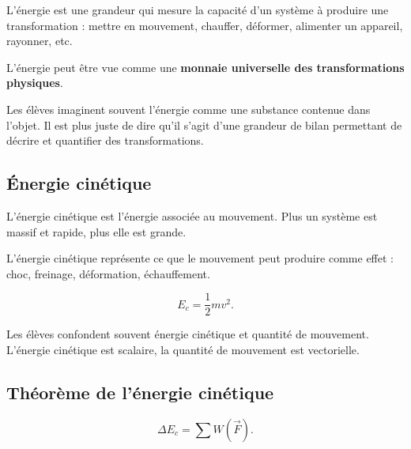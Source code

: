 \documentclass[11pt,a4paper]{article}
\begin{document}
\begin{sens}
L'énergie est une grandeur qui mesure la capacité d'un système à produire une transformation :
mettre en mouvement, chauffer, déformer, alimenter un appareil, rayonner, etc.
\end{sens}

\begin{imagem}
L'énergie peut être vue comme une \textbf{monnaie universelle des transformations physiques}.
\end{imagem}

\begin{fausseintuition}
Les élèves imaginent souvent l'énergie comme une substance contenue dans l'objet.
Il est plus juste de dire qu'il s'agit d'une grandeur de bilan permettant de décrire et quantifier des transformations.
\end{fausseintuition}

\subsection{Énergie cinétique}

\begin{sens}
L'énergie cinétique est l'énergie associée au mouvement.
Plus un système est massif et rapide, plus elle est grande.
\end{sens}

\begin{imagem}
L'énergie cinétique représente ce que le mouvement peut produire comme effet :
choc, freinage, déformation, échauffement.
\end{imagem}

\begin{bilan}
\[
E_c=\frac12 mv^2.
\]
\end{bilan}

\begin{fausseintuition}
Les élèves confondent souvent énergie cinétique et quantité de mouvement.
L'énergie cinétique est scalaire, la quantité de mouvement est vectorielle.
\end{fausseintuition}

\subsection{Théorème de l'énergie cinétique}

\begin{bilan}
\[
\Delta E_c = \sum W(\vec F).
\]
\end{bilan}
\end{document}
